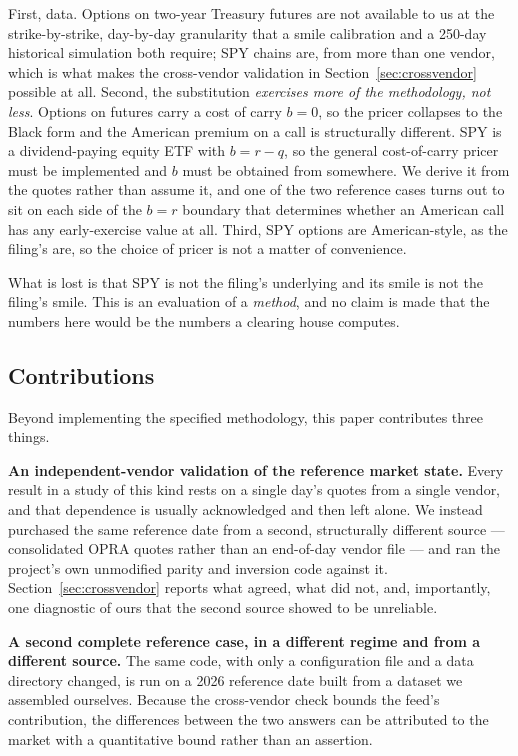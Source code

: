 \documentclass[11pt]{article}
\begin{document}
First, data. Options on two-year Treasury futures are not available to us at the
strike-by-strike, day-by-day granularity that a smile calibration and a 250-day
historical simulation both require; SPY chains are, from more than one vendor, which is
what makes the cross-vendor validation in Section~\ref{sec:crossvendor} possible at all.
Second, the substitution \emph{exercises more of the methodology, not less}. Options on
futures carry a cost of carry $b=0$, so the pricer collapses to the Black
\citeyearpar{black1976} form and the American premium on a call is structurally
different. SPY is a dividend-paying equity ETF with $b=r-q$, so the general
cost-of-carry pricer must be implemented and $b$ must be obtained from somewhere. We
derive it from the quotes rather than assume it, and one of the two reference cases
turns out to sit on each side of the $b=r$ boundary that determines whether an American
call has any early-exercise value at all. Third, SPY options are American-style, as the
filing's are, so the choice of pricer is not a matter of convenience.

What is lost is that SPY is not the filing's underlying and its smile is not the
filing's smile. This is an evaluation of a \emph{method}, and no claim is made that the
numbers here would be the numbers a clearing house computes.

\subsection{Contributions}

Beyond implementing the specified methodology, this paper contributes three things.

\textbf{An independent-vendor validation of the reference market state.} Every result
in a study of this kind rests on a single day's quotes from a single vendor, and that
dependence is usually acknowledged and then left alone. We instead purchased the same
reference date from a second, structurally different source --- consolidated OPRA
quotes rather than an end-of-day vendor file --- and ran the project's own unmodified
parity and inversion code against it. Section~\ref{sec:crossvendor} reports what agreed,
what did not, and, importantly, one diagnostic of ours that the second source showed to
be unreliable.

\textbf{A second complete reference case, in a different regime and from a different
source.} The same code, with only a configuration file and a data directory changed,
is run on a 2026 reference date built from a dataset we assembled ourselves. Because
the cross-vendor check bounds the feed's contribution, the differences between the two
answers can be attributed to the market with a quantitative bound rather than an
assertion.
\end{document}
